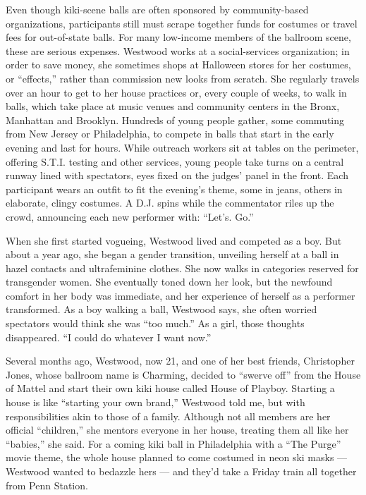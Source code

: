Even though kiki-scene balls are often sponsored by community-based
organizations, participants still must scrape together funds for
costumes or travel fees for out-of-state balls. For many low-income
members of the ballroom scene, these are serious expenses. Westwood
works at a social-services organization; in order to save money, she
sometimes shops at Halloween stores for her costumes, or ``effects,''
rather than commission new looks from scratch. She regularly travels
over an hour to get to her house practices or, every couple of weeks, to
walk in balls, which take place at music venues and community centers in
the Bronx, Manhattan and Brooklyn. Hundreds of young people gather, some
commuting from New Jersey or Philadelphia, to compete in balls that
start in the early evening and last for hours. While outreach workers
sit at tables on the perimeter, offering S.T.I. testing and other
services, young people take turns on a central runway lined with
spectators, eyes fixed on the judges' panel in the front. Each
participant wears an outfit to fit the evening's theme, some in jeans,
others in elaborate, clingy costumes. A D.J. spins while the commentator
riles up the crowd, announcing each new performer with: ``Let's. Go.''

When she first started vogueing, Westwood lived and competed as a boy.
But about a year ago, she began a gender transition, unveiling herself
at a ball in hazel contacts and ultrafeminine clothes. She now walks in
categories reserved for transgender women. She eventually toned down her
look, but the newfound comfort in her body was immediate, and her
experience of herself as a performer transformed. As a boy walking a
ball, Westwood says, she often worried spectators would think she was
``too much.'' As a girl, those thoughts disappeared. ``I could do
whatever I want now.''

Several months ago, Westwood, now 21, and one of her best friends,
Christopher Jones, whose ballroom name is Charming, decided to ``swerve
off'' from the House of Mattel and start their own kiki house called
House of Playboy. Starting a house is like ``starting your own brand,''
Westwood told me, but with responsibilities akin to those of a family.
Although not all members are her official ``children,'' she mentors
everyone in her house, treating them all like her ``babies,'' she said.
For a coming kiki ball in Philadelphia with a ``The Purge'' movie theme,
the whole house planned to come costumed in neon ski masks --- Westwood
wanted to bedazzle hers --- and they'd take a Friday train all together
from Penn Station.

